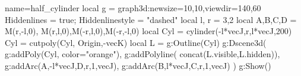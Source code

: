\documentclass{standalone}
\begin{document}
\begin{luadraw}{name=half_cylinder}
local g = graph3d:new{size={10,10},viewdir={140,60}}
Hiddenlines = true; Hiddenlinestyle = "dashed"
local l, r = 3,2
local A,B,C,D = M(r,-l,0), M(r,l,0),M(-r,l,0),M(-r,-l,0)
local Cyl = cylinder(-l*vecJ,r,l*vecJ,200)
Cyl = cutpoly(Cyl, {Origin,-vecK})
local L = g:Outline(Cyl)
g:Dscene3d(
    g:addPoly(Cyl, {color="orange"}),
    g:addPolyline( concat(L.visible,L.hidden)),
    g:addArc(A,-l*vecJ,D,r,1,vecJ),
    g:addArc(B,l*vecJ,C,r,1,vecJ)
    )
g:Show()
\end{luadraw}
\end{document}
